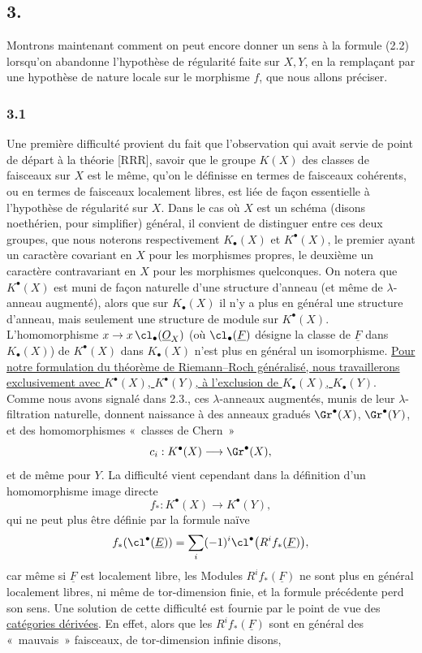 \subsection*{3.}
Montrons maintenant comment on peut encore donner un sens à la formule (2.2) lorsqu'on abandonne l'hypothèse de régularité faite sur $X,Y$, en la remplaçant par une hypothèse de nature locale sur le morphisme $f$, que nous allons préciser.

\subsubsection*{3.1}
Une première difficulté provient du fait que l'observation qui avait servie de point de départ à la théorie [RRR], savoir que le groupe $K(X)$ des classes de faisceaux sur $X$ est le même, qu'on le définisse en termes de faisceaux cohérents, ou en termes de faisceaux localement libres, est liée de façon essentielle à l'hypothèse de régularité sur $X$. Dans le cas où $X$ est un schéma (disons noethérien, pour simplifier) général, il convient de distinguer entre ces deux groupes, que nous noterons respectivement $K_\bullet(X)$ et $K^\bullet(X)$, le premier ayant un caractère covariant en $X$ pour les morphismes propres, le deuxième un caractère contravariant en $X$ pour les morphismes quelconques. On notera que $K^\bullet(X)$ est muni de façon naturelle d'une structure d'anneau (et même de $\lambda$-anneau augmenté), alors que sur $K_\bullet(X)$ il n'y a plus en général une structure d'anneau, mais seulement une structure de module sur $K^\bullet(X)$. L'homomorphisme $x\to x\,\cl_\bullet(\underline O_X)$ (où $\cl_\bullet(\underline F)$ désigne la classe de $\underline F$ dans $K_\bullet(X)$) de $K^\bullet(X)$ dans $K_\bullet(X)$ n'est plus en général un isomorphisme. \uline{Pour notre formulation du théorème de Riemann--Roch généralisé, nous travaillerons exclusivement avec $K^\bullet(X)$, $K^\bullet(Y)$, à l'exclusion de $K_\bullet(X)$, $K_\bullet(Y)$}. Comme nous avons signalé dans 2.3., ces $\lambda$-anneaux augmentés, munis de leur $\lambda$-filtration naturelle, donnent naissance à des anneaux gradués $\Gr^\bullet(X)$, $\Gr^\bullet(Y)$, et des homomorphismes «~classes de Chern~»
\[
c_i:K^\bullet(X)\longrightarrow \Gr^\bullet(X),
\]
et de même pour $Y$. La difficulté vient cependant dans la définition d'un homomorphisme image directe
\begin{equation}\tag{3.1}
f_*:K^\bullet(X)\longrightarrow K^\bullet(Y),
\end{equation}
qui ne peut plus être définie par la formule naïve
\[
f_*(\cl^\bullet(\underline E))=\sum_i(-1)^i\cl^\bullet\bigl(R^if_*(\underline F)\bigr),
\]
car même si $\underline F$ est localement libre, les Modules $R^if_*(\underline F)$ ne sont plus en général localement libres, ni même de tor-dimension finie, et la formule précédente perd son sens. Une solution de cette difficulté est fournie par le point de vue des \underline{catégories dérivées}. En effet, alors que les $R^if_*(\underline F)$ sont en général des «~mauvais~» faisceaux, de tor-dimension infinie disons,
